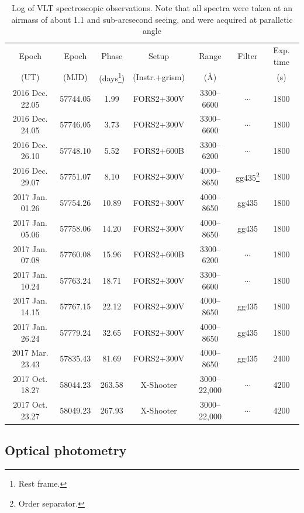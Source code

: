 \documentclass[fleqn,usenatbib]{mnras}
\begin{document}
\begin{table}
 \centering
 \caption{ Log of VLT spectroscopic observations. Note that all spectra were taken at an airmass of about 1.1 and sub-arcsecond seeing, and were acquired at parallctic angle}
 \begin{minipage}{350mm}
  \begin{tabular}{ccccccc}
  \hline
Epoch  &    Epoch    &       Phase              &   Setup    &      Range      & Filter & Exp. time\\
(UT)    &     (MJD)      &     (days\footnote{Rest frame.})     &     (Instr.+grism)         &  (\AA)   & & (s) \\
   \hline
2016 Dec. 22.05 &   57744.05   & 1.99  & FORS2+300V & 3300--6600 &$\cdots$ & 1800 \\
2016 Dec. 24.05 &   57746.05   & 3.73  & FORS2+300V & 3300--6600 &$\cdots$ & 1800 \\
2016 Dec. 26.10   & 57748.10   & 5.52  & FORS2+600B & 3300--6200 &$\cdots$ & 1800 \\    
2016 Dec. 29.07   & 57751.07  &  8.10  & FORS2+300V & 4000--8650 & gg435\footnote{Order separator.} & 1800 \\
2017 Jan. 01.26 &   57754.26   & 10.89 & FORS2+300V & 4000--8650 &gg435 & 1800 \\
2017 Jan. 05.06  &  57758.06   & 14.20 & FORS2+300V & 4000--8650 &gg435 & 1800 \\
2017 Jan. 07.08  &  57760.08   & 15.96 & FORS2+600B & 3300--6200 &$\cdots$      & 1800 \\
2017 Jan. 10.24  &  57763.24  &  18.71 & FORS2+300V & 3300--6600 &$\cdots$      & 1800 \\
2017 Jan. 14.15  &  57767.15  &  22.12 & FORS2+300V & 4000--8650 &gg435 & 1800 \\
2017 Jan. 26.24  &57779.24     & 32.65 & FORS2+300V & 4000--8650 &gg435 & 1800 \\
2017 Mar. 23.43  &   57835.43 & 81.69  & FORS2+300V & 4000--8650 &gg435 & 2400\\
2017 Oct. 18.27 & 58044.23 & 263.58 & X-Shooter     & 3000--22,000 &$\cdots$      & 4200  \\
2017 Oct. 23.27 & 58049.23 & 267.93 & X-Shooter     & 3000--22,000 &$\cdots$      & 4200 \\
   \hline
\end{tabular}
\label{table:logofspectra}
\end{minipage}
\end{table} 


\subsection{Optical photometry}
\end{document}
